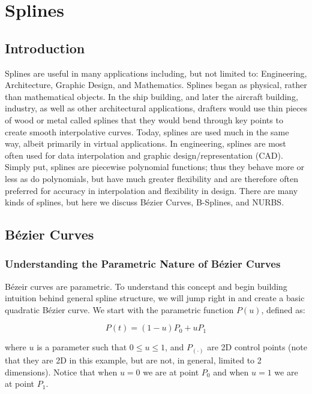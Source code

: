 


	
\chapter{Splines}
\label{ch:splines}


\section{Introduction}
\label{sec:splinesintro}

Splines are useful in many applications including, but not limited to: Engineering, Architecture, Graphic Design, and Mathematics. Splines began as physical, rather than mathematical objects. In the ship building, and later the aircraft building, industry, as well as other architectural applications, drafters would use thin pieces of wood or metal called splines that they would bend through key points to create smooth interpolative curves.  Today, splines are used much in the same way, albeit primarily in virtual applications.  In engineering, splines are most often used for data interpolation and graphic design/representation (CAD). Simply put, splines are piecewise polynomial functions; thus they behave more or less as do polynomials, but have much greater flexibility and are therefore often preferred for accuracy in interpolation and flexibility in design. There are many kinds of splines, but here we discuss Bézier Curves, B-Splines, and NURBS.

\section{Bézier Curves}
\subsection{Understanding the Parametric Nature of Bézier Curves}
Bézeir curves are parametric.  To understand this concept and begin building intuition behind general spline structure, we will jump right in and create a basic quadratic Bézier curve. We start with the parametric function $P(u)$, defined as:

\begin{equation}
\label{eq:parametricrelation}
P(t) = (1-u)P_0 + uP_1
\end{equation}

where $u$ is a parameter such that $0 \leq u \leq 1$, and $P_{(\cdot)}$ are 2D control points (note that they are 2D in this example, but are not, in general, limited to 2 dimensions). Notice that when $u=0$ we are at point $P_0$ and when $u=1$ we are at point $P_1$. 


